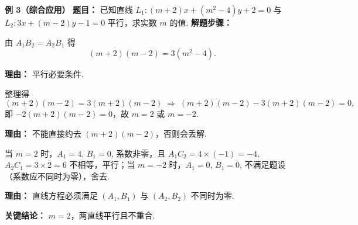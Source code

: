 \begin{examplebox}
	\medskip
	\textbf{\textcolor{CExample}{例 3（综合应用）}}
	\textbf{\textcolor{CExample}{题目：}}
	已知直线 $L_1: (m+2)x + (m^2-4)y + 2 = 0$ 与 $L_2: 3x + (m-2)y - 1 = 0$ 平行，求实数 $m$ 的值.
	\textbf{\textcolor{CExample}{解题步骤：}}
	\begin{description}[style=nextline, leftmargin=2.8em, labelsep=0.5em, itemsep=0.45em]
		\item[\textbf{第一步（列条件）：}]
			由 $A_1B_2 = A_2B_1$ 得
			\[
				(m+2)(m-2) = 3(m^2-4).
			\]
			\par\textbf{理由：} 平行必要条件.
		\item[\textbf{第二步（解方程）：}]
			整理得
			\[
				(m+2)(m-2) = 3(m+2)(m-2) \;\Longrightarrow\; (m+2)(m-2) - 3(m+2)(m-2)=0,
			\]
			即 $-2(m+2)(m-2)=0$，故 $m=2$ 或 $m=-2$.
			\par\textbf{理由：} 不能直接约去 $(m+2)(m-2)$，否则会丢解.
		\item[\textbf{第三步（检验退化）：}]
			当 $m=2$ 时，$A_1=4$, $B_1=0$, 系数非零，且 $A_1C_2=4\times(-1)=-4$, $A_2C_1=3\times2=6$ 不相等，平行；当 $m=-2$ 时，$A_1=0$, $B_1=0$, 不满足题设（系数应不同时为零），舍去.
			\par\textbf{理由：} 直线方程必须满足 $(A_1,B_1)$ 与 $(A_2,B_2)$ 不同时为零.
	\end{description}
	\textbf{\textcolor{CExample}{关键结论：}}
	$m=2$，两直线平行且不重合.
\end{examplebox}
